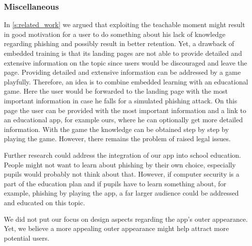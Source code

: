 \subsubsection{Miscellaneous}
\begin{description}[leftmargin=0cm]
\item[Embedded Training:] In \autoref{s:related_work} we argued that exploiting the teachable moment might result in good motivation for a user to do something about his lack of knowledge regarding phishing and possibly result in better retention.
	Yet, a drawback of embedded training is that its landing pages are not able to provide detailed and extensive information on the topic since users would be discouraged and leave the page.
	Providing detailed and extensive information can be addressed by a game playfully.
	Therefore, an idea is to combine embedded learning with an educational game.
	Here the user would be forwarded to the landing page with the most important information in case he falls for a simulated phishing attack.
	On this page the user can be provided with the most important information and a link to an educational app, for example ours, where he can optionally get more detailed information.
	With the game the knowledge can be obtained step by step by playing the game.
However, there remains the problem of raised legal issues.

\item[Integration of App into School Education]
Further research could address the integration of our app into school education.
People might not want to learn about phishing by their own choice, especially pupils would probably not think about that.
However, if computer security is a part of the education plan and if pupils have to learn something about, for example, phishing by playing the app, a far larger audience could be addressed and educated on this topic.

\item[More Appealing Outer Appearance]
We did not put our focus on design aspects regarding the app's outer appearance.
Yet, we believe a more appealing outer appearance might help attract more potential users.
\end{description}

